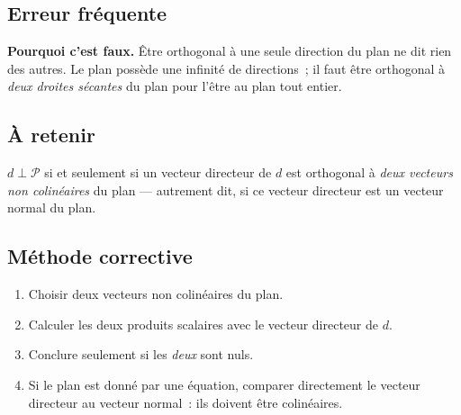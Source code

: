 

\subsection*{Erreur fréquente}


\textbf{Pourquoi c'est faux.} Être orthogonal à une seule direction du plan ne
dit rien des autres. Le plan possède une infinité de directions~; il faut être
orthogonal à \emph{deux droites sécantes} du plan pour l'être au plan tout
entier.


\subsection*{À retenir}

$d\perp\mathcal{P}$ si et seulement si un vecteur directeur de $d$ est
orthogonal à \emph{deux vecteurs non colinéaires} du plan --- autrement dit,
si ce vecteur directeur est un vecteur normal du plan.

\subsection*{Méthode corrective}

\begin{enumerate}
  \item Choisir deux vecteurs non colinéaires du plan.
  \item Calculer les deux produits scalaires avec le vecteur directeur de $d$.
  \item Conclure seulement si les \emph{deux} sont nuls.
  \item Si le plan est donné par une équation, comparer directement le vecteur
        directeur au vecteur normal~: ils doivent être colinéaires.
\end{enumerate}

